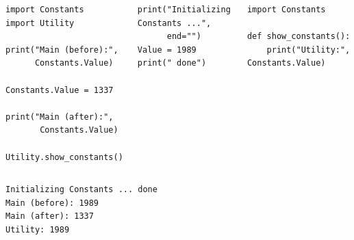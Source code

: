 \begin{frame}[fragile]
%
\vspace{-6pt}
\begin{columns}[T]
\begin{codebox}
\begin{verbatim}
import Constants
import Utility

print("Main (before):",
      Constants.Value)

Constants.Value = 1337

print("Main (after):",
       Constants.Value)

Utility.show_constants()
\end{verbatim}
\end{codebox}
%
\begin{codebox}
\begin{verbatim}
print("Initializing Constants ...",
      end="")
Value = 1989
print(" done")
\end{verbatim}
\end{codebox}
%
\vspace{-3pt}
\begin{codebox}
\begin{verbatim}
import Constants

def show_constants():
    print("Utility:", Constants.Value)
\end{verbatim}
\end{codebox}
\end{columns}
%
\begin{cmdbox}[Output]
\begin{verbatim}
Initializing Constants ... done
Main (before): 1989
Main (after): 1337
Utility: 1989
\end{verbatim}
\end{cmdbox}
%
\end{frame}


